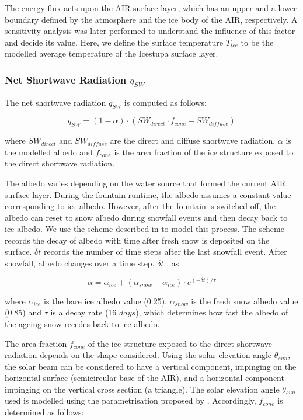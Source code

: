 \documentclass[utf8]{frontiersSCNS}
\begin{document}
The energy flux acts upon the AIR surface layer, which has an upper and a lower boundary defined by the
atmosphere and the ice body of the AIR, respectively.  A sensitivity analysis was later performed
to understand the influence of this factor and decide its value. Here, we define the surface temperature
$T_{ice}$ to be the modelled average temperature of the Icestupa surface layer.

\subsubsection{Net Shortwave Radiation \texorpdfstring{$q_{SW}$}{Lg}}

The net shortwave radiation $q_{SW}$ is computed as follows:

\begin{equation} q_{SW} = (1- \alpha)\cdot (SW_{direct} \cdot f_{cone} + SW_{diffuse}) \label{eqn:SW} \end{equation}

where $SW_{direct}$ and $SW_{diffuse}$ are the direct and diffuse shortwave radiation, $\alpha$ is the
modelled albedo and $f_{cone}$ is the area fraction of the ice structure exposed to the direct shortwave
radiation.

The albedo varies depending on the water source that formed the current AIR surface layer. During the fountain
runtime, the albedo assumes a constant value corresponding to ice albedo. However, after the fountain is
switched off, the albedo can reset to snow albedo during snowfall events and then decay back to ice albedo. We
use the scheme described in \cite{OerlemansKnap_1998} to model this process. The scheme records the decay of
albedo with time after fresh snow is deposited on the surface. $\delta t$ records the number of time steps after
the last snowfall event. After snowfall, albedo changes over a time step, $\delta t$ , as

\begin{equation} \alpha=\alpha_{ice}+(\alpha_{snow}-\alpha_{ice}) \cdot e^{(-\delta t)/\tau} \label{eqn:a}
\end{equation}

where $\alpha_{ice}$ is the bare ice albedo value (0.25), $\alpha_{snow}$ is the fresh snow albedo value (0.85)
and $\tau$ is a decay rate (16 $days$), which determines how fast the albedo of the ageing snow recedes back to ice albedo.

The area fraction $f_{cone}$ of the ice structure exposed to the direct shortwave radiation depends on the shape
considered. Using the solar elevation angle $\theta_{sun}$, the solar beam can be considered to have a vertical
component, impinging on the horizontal surface (semicircular base of the AIR), and a horizontal component
impinging on the vertical cross section (a triangle). The solar elevation angle $\theta_{sun}$ used is modelled
using the parametrisation proposed by \cite{Woolf_1968}. Accordingly, $f_{cone}$ is determined as follows:
\end{document}
